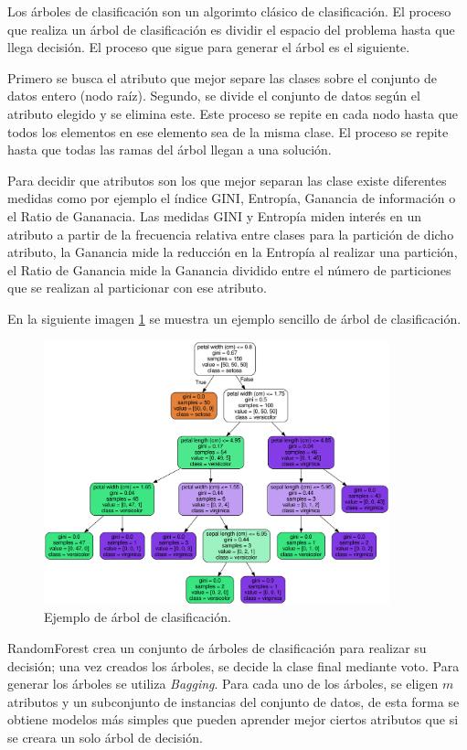 Los árboles de clasificación son un algorimto clásico de clasificación. El proceso que realiza un árbol de clasificación es dividir el espacio del problema hasta que llega decisión. El proceso que sigue para generar el árbol es el siguiente.\newline

Primero se busca el atributo que mejor separe las clases sobre el conjunto de datos entero (nodo raíz). Segundo, se divide el conjunto de datos según el atributo elegido y se elimina este. Este proceso se repite en cada nodo hasta que todos los elementos en ese elemento sea de la misma clase. El proceso se repite hasta que todas las ramas del árbol llegan a una solución.\newline

Para decidir que atributos son los que mejor separan las clase existe diferentes medidas como por ejemplo el índice GINI, Entropía, Ganancia de información o el Ratio de Gananacia. Las medidas GINI y Entropía miden interés en un atributo a partir de la frecuencia relativa entre clases para la partición de dicho atributo, la Ganancia mide la reducción en la Entropía al realizar una partición, el Ratio de Ganancia mide la Ganancia dividido entre el número de particiones que se realizan al particionar con ese atributo. \newline

En la siguiente imagen \ref{fig:216} se muestra un ejemplo sencillo de árbol de clasificación.

\begin{figure}[h]
	\centering
	\includegraphics[width=100mm]{imagenes/tree_example.png}
	\caption{Ejemplo de árbol de clasificación.}
	\label{fig:216}
\end{figure}
\verticalspace

RandomForest crea un conjunto de árboles de clasificación para realizar su decisión; una vez creados los árboles, se decide la clase final mediante voto. Para generar los árboles se utiliza \textit{Bagging}. Para cada uno de los árboles, se eligen $m$ atributos y un subconjunto de instancias del conjunto de datos, de esta forma se obtiene modelos más simples que pueden aprender mejor ciertos atributos que si se creara un solo árbol de decisión.\newline

